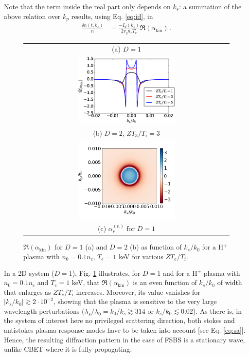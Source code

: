 \documentclass[
 reprint,
 amsmath,amssymb,
 aps,
]{revtex4-1}
\begin{document}
Note that the term inside the real part only depends on $k_s$:   a summation of the above relation over $k_p$ results, using Eq. \eqref{eq:id}, in  
\begin{align}
\frac{ \delta n (t,k_s ) }{n}  &=   \frac{ -I_d(k_s) }{ 2 v_g n_c T_e } 
 \Re \left( \alpha_\mathrm{kin}   \right)  \, .\label{eq:drakef}
\end{align}

\begin{figure}
\begin{tabular}{c}
(a) $D=1$\\
\includegraphics[width=0.49\textwidth]{akin.eps}\\
(b) $D=2$, $ZT_3/T_i=3$\\
\includegraphics[width=0.49\textwidth]{real_F_kin_3d_vd0cs_te1keV_Ti300eV_H+.png}\\
(c) $\alpha_r^{(n)}$ for  $D=1$\\
\end{tabular}
\caption{ \label{fig:akin}  
 $\Re \left( \alpha_\mathrm{kin}   \right)$ for $D=1$ (a) and $D=2$ (b) as function of $k_s/k_0$ for a H$^{+}$ plasma with $n_0=0.1n_c$, $T_e =1$ keV for various $ZT_e/T_i$. 
 }
\end{figure}
In a 2D system ($D=1$), Fig. \ref{fig:akin} illustrates, for $D=1$ and for  a H$^{+}$ plasma with $n_0=0.1n_c$ and  $T_e =1$ keV, that $\Re \left( \alpha_\mathrm{kin}   \right)$ is an even function  of $k_s/k_0$ of width that enlarges as  $ZT_e/T_i$ increases. Moreover, its value vanishes for $\vert k_s/k_0 \vert  \gtrsim 2 \cdot 10^{-2}$, showing that the plasma is sensitive  to the very large wavelength perturbations ($\lambda_s/\lambda_0=k_0/k_s\gtrsim 314 $ or $k_s/k_0\lesssim 0.02$). As there is, in  the system of interest here no privileged scattering direction, both stokes and antistokes plasma response modes have to be taken into account [see Eq. \eqref{eq:sa}]. Hence,  the resulting diffraction pattern  in the case of FSBS is  a stationary  wave, unlike CBET where it is fully propagating.
\end{document}
